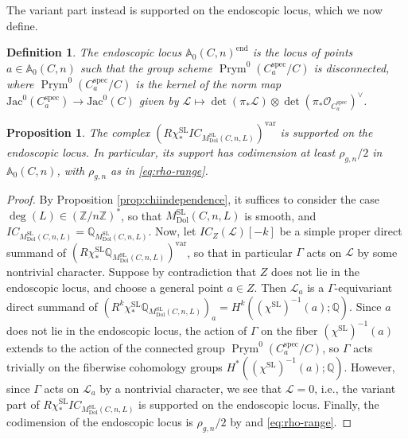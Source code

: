 \documentclass[11pt,reqno]{amsart}
\theoremstyle{plain} %
\newtheorem{prop}[theorem]{Proposition}
\newtheorem{definition}[theorem]{Definition}
\theoremstyle{definition}
\newcommand{\QQ}{\mathbb{Q}}
\newcommand{\mc}{\mathcal}
\newcommand{\ZZ}{\mathbb{Z}}
\DeclareMathOperator{\SL}{SL}
\newcommand{\Dol}{\mathrm{Dol}}
\newcommand{\Jac}{\mathrm{Jac}}
\newcommand{\IC}{IC}
\renewcommand{\AA}{\mathbb{A}}
\DeclareMathOperator{\Prym}{Prym}
\DeclareMathOperator{\spec}{spec}
\DeclareMathOperator{\nne}{end}
\begin{document}
The variant part instead is supported on the endoscopic locus, which we now define.
\begin{definition} 
    The endoscopic locus $\AA_0(C,n)^{\nne}$ is the locus of points $a\in \AA_0(C,n)$ such that the group scheme $\Prym^{0}(C^{\spec}_a/C)$ is disconnected, where $\Prym^{0}(C^{\spec}_a/C)$ is the kernel of the norm map $\Jac^{0}(C^{\spec}_a) \to \Jac^0(C)$ given by $\mathcal{L} \mapsto \det(\pi_*\mathcal{L}) \otimes \det(\pi_*\mathcal{O}_{C^{\spec}_a})^{\vee}$. 
\end{definition}

\begin{prop} \label{prop: SL var}
     The complex $(R\chi^{\SL}_* \IC_{M^{\SL}_{\Dol}(C,n,L)})^{\mathrm{var}}$ is supported on the endoscopic locus. In particular, its support has codimension at least $\rho_{g,n}/2$ in $\AA_0(C,n)$, with $\rho_{g,n}$ as in \eqref{eq:rho-range}.
\end{prop} 
\begin{proof} By Proposition \ref{prop:chiindependence}, it suffices to consider the case $\deg(L) \in (\ZZ/n\ZZ)^*$, so that $M^{\SL}_{\Dol}(C,n,L)$ is smooth, and $\IC_{M^{\SL}_{\Dol}(C,n,L)}=\QQ_{M^{\SL}_{\Dol}(C,n,L)}$. Now, let $\IC_Z(\mathcal{L})[-k]$ be a simple proper direct summand of $(R\chi^{\SL}_* \QQ_{M^{\SL}_{\Dol}(C,n,L)})^{\mathrm{var}}$, so that in particular $\Gamma$ acts on $\mc L$ by some nontrivial character. Suppose by contradiction that $Z$ does not lie in the endoscopic locus, and choose a general point $a \in Z$. Then $\mathcal{L}_a$ is a $\Gamma$-equivariant direct summand of $(R^{k} \chi^{\SL}_{*} \QQ_{M^{\SL}_{\Dol}(C,n,L)})_a =H^k((\chi^{\SL})^{-1}(a); \QQ)$.
Since $a$ does not lie in the endoscopic locus, the action of $\Gamma$ on the fiber $(\chi^{\SL})^{-1}(a)$ extends to the action of the connected group $\Prym^{0}(C^{\spec}_a/C)$, so
$\Gamma$ acts trivially on the fiberwise cohomology groups $H^*((\chi^{\SL})^{-1}(a); \QQ)$. However, since $\Gamma$ acts on $\mc L_a$ by a nontrivial character, we see that $\mathcal{L}=0$, i.e., the variant part of $R\chi^{\SL}_* \IC_{M^{\SL}_{\Dol}(C,n,L)}$ is supported on the endoscopic locus. %
Finally, the codimension of the endoscopic locus is $\rho_{g,n}/2$ by \cite[Corollary 1.3, Lemma 7.1]{Hausel-Pauly} and \eqref{eq:rho-range}. %
\end{proof}
\end{document}
